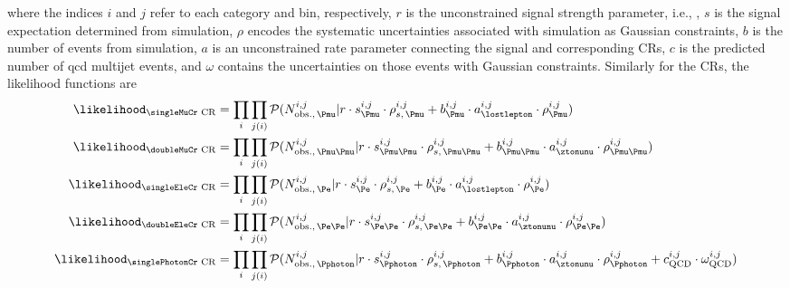 where the indices $i$ and $j$ refer to each category and \ptmiss bin, respectively, $r$ is the unconstrained signal strength parameter, i.e., \BRHinvFull, $s$ is the signal expectation determined from simulation, $\rho$ encodes the systematic uncertainties associated with simulation as Gaussian constraints, $b$ is the number of events from simulation, $a$ is an unconstrained rate parameter connecting the signal and corresponding \glspl{CR}, $c$ is the predicted number of \acrshort{qcd} multijet events, and $\omega$ contains the uncertainties on those events with Gaussian constraints. Similarly for the \glspl{CR}, the likelihood functions are
\begin{equation}
    \begin{aligned}
\likelihood_{\text{\singleMuCr CR}} &= \prod_{i} \prod_{j(i)} \mathcal{P}( N_{\mathrm{obs.}, \, \Pmu }^{i, j} | r \cdot s^{i, j}_{\Pmu} \cdot \rho_{s,\, \Pmu}^{i, j} + b_{\Pmu}^{i, j} \cdot a_{\lostlepton}^{i, j} \cdot \rho_{\Pmu}^{i, j} )\\
\likelihood_{\text{\doubleMuCr CR}} &= \prod_{i} \prod_{j(i)} \mathcal{P}( N_{\mathrm{obs.}, \, \Pmu\Pmu }^{i, j} | r \cdot s^{i, j}_{\Pmu\Pmu} \cdot \rho_{s,\, \Pmu\Pmu}^{i, j} + b_{\Pmu\Pmu}^{i, j} \cdot a_{\ztonunu}^{i, j} \cdot \rho_{\Pmu\Pmu}^{i, j} )\\
\likelihood_{\text{\singleEleCr CR}} &= \prod_{i} \prod_{j(i)} \mathcal{P}( N_{\mathrm{obs.}, \, \Pe }^{i, j} | r \cdot s^{i, j}_{\Pe} \cdot \rho_{s,\, \Pe}^{i, j} + b_{\Pe}^{i, j} \cdot a_{\lostlepton}^{i, j} \cdot \rho_{\Pe}^{i, j} )\\
\likelihood_{\text{\doubleEleCr CR}} &= \prod_{i} \prod_{j(i)} \mathcal{P}( N_{\mathrm{obs.}, \, \Pe\Pe }^{i, j} | r \cdot s^{i, j}_{\Pe\Pe} \cdot \rho_{s,\, \Pe\Pe}^{i, j} + b_{\Pe\Pe}^{i, j} \cdot a_{\ztonunu}^{i, j} \cdot \rho_{\Pe\Pe}^{i, j} )\\
\likelihood_{\text{\singlePhotonCr CR}} &= \prod_{i} \prod_{j(i)} \mathcal{P}( N_{\mathrm{obs.}, \, \Pphoton }^{i, j} | r \cdot s^{i, j}_{\Pphoton} \cdot \rho_{s,\, \Pphoton}^{i, j} + b_{\Pphoton}^{i, j} \cdot a_{\ztonunu}^{i, j} \cdot \rho_{\Pphoton}^{i, j} + c_{\mathrm{QCD}}^{i, j} \cdot \omega_{\mathrm{QCD}}^{i, j} )
    \end{aligned}
    \label{eq:likelihood_CRs}
\end{equation}
